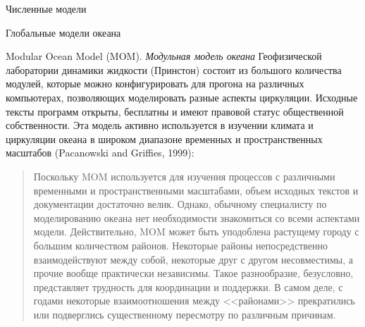 \begin{chapter}{Численные модели}
\begin{section}{Глобальные модели океана}
\begin{paragraph}{Modular Ocean Model (MOM).}
%
\emph{Модульная модель океана} Геофизической лаборатории динамики жидкости (Принстон)
состоит из большого количества модулей, которые можно конфигурировать для
прогона на различных компьютерах, позволяющих моделировать разные аспекты 
циркуляции. Исходные тексты программ открыты, бесплатны и имеют правовой
статус общественной собственности. Эта модель активно используется в изучении 
климата и циркуляции океана в широком диапазоне временных и пространственных
масштабов (Pacanowski and Griffies, 1999):
% 
\begin{quote}
Поскольку MOM используется для изучения процессов с различными временными 
и пространственными масштабами, объем исходных текстов и документации 
достаточно велик. Однако, обычному специалисту по моделированию океана
нет необходимости знакомиться со всеми аспектами модели. Действительно,
MOM может быть уподоблена растущему городу с большим количеством
районов. Некоторые районы непосредственно взаимодействуют между собой, 
некоторые друг с другом несовместимы, а прочие вообще практически независимы. 
Такое разнообразие, безусловно, представляет трудность для координации 
и поддержки. В самом деле, с годами некоторые взаимоотношения между 
<<районами>> прекратились или подверглись существенному пересмотру 
по различным причинам.
%
\end{quote}


\end{paragraph}
\end{section}
\end{chapter}

